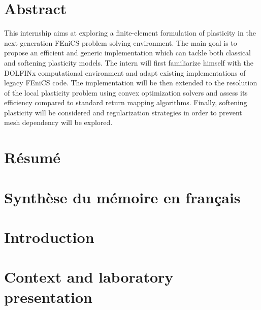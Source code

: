 \documentclass[12pt]{article}
\begin{document}
\section*{\centering Abstract}
This internship aims at exploring a finite-element formulation of plasticity in the next generation FEniCS problem solving environment. The main goal is to propose an efficient and generic implementation which can tackle both classical and softening plasticity models. The intern will first familiarize himself with the DOLFINx computational environment and adapt existing implementations of legacy FEniCS code. The implementation will be then extended to the resolution of the local plasticity problem using convex optimization solvers and assess its efficiency compared to standard return mapping algorithms. Finally, softening plasticity will be considered and regularization strategies in order to prevent mesh dependency will be explored.

\newpage
\section*{\centering Résumé}

\newpage
\section*{\centering Synthèse du mémoire en français}

\renewcommand{\contentsname}{\centering Table of contents}
\renewcommand{\listtablename}{\centering List of tables}
\renewcommand{\listfigurename}{\centering List of figures}

\newpage
\tableofcontents
\newpage
{}
{}
\listoftables
\newpage
{}
{}
\listoffigures

\newpage
{}
{}
\section*{Introduction}

\newpage
\section{Context and laboratory presentation}
\end{document}
